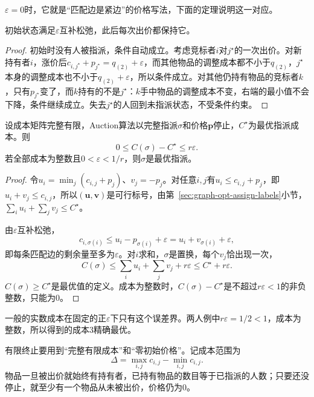 $\varepsilon=0$时，它就是“匹配边是紧边”的价格写法，下面的定理说明这一对应。

\begin{lemma}
初始状态满足$\varepsilon$互补松弛，此后每次出价都保持它。
\end{lemma}

\begin{proof}
初始时没有人被指派，条件自动成立。考虑竞标者$i$对$j^\star$的一次出价。对新持有者$i$，涨价后$c_{i,j^\star}+p_{j^\star}=q_{(2)}+\varepsilon$，而其他物品的调整成本都不小于$q_{(2)}$，$j^\star$本身的调整成本也不小于$q_{(2)}+\varepsilon$，所以条件成立。对其他仍持有物品的竞标者$k$，只有$p_{j^\star}$变了，而$k$持有的不是$j^\star$：$k$手中物品的调整成本不变，右端的最小值不会下降，条件继续成立。失去$j^\star$的人回到未指派状态，不受条件约束。
\end{proof}

\begin{theorem}[Auction算法的误差界]
\label{thm:graph-opt-auction}
设成本矩阵完整有限，Auction算法以完整指派$\sigma$和价格$\bm p$停止，$C^\star$为最优指派成本。则
\begin{equation}
  0\leq C(\sigma)-C^\star\leq r\varepsilon.
  \label{eq:graph-opt-auction-error}
\end{equation}
若全部成本为整数且$0<\varepsilon<1/r$，则$\sigma$是最优指派。
\end{theorem}

\begin{proof}
令$u_i=\min_j(c_{i,j}+p_j)$、$v_j=-p_j$。对任意$i,j$有$u_i\leq c_{i,j}+p_j$，即$u_i+v_j\leq c_{i,j}$，所以$(\bm u,\bm v)$是可行标号，由第~\ref{sec:graph-opt-assign-labels}小节，$\sum_iu_i+\sum_jv_j\leq C^\star$。

由$\varepsilon$互补松弛，
\[
  c_{i,\sigma(i)}\leq u_i-p_{\sigma(i)}+\varepsilon=u_i+v_{\sigma(i)}+\varepsilon,
\]
即每条匹配边的剩余量至多为$\varepsilon$。对$i$求和，$\sigma$是置换，每个$v_j$恰出现一次，
\[
  C(\sigma)\leq\sum_iu_i+\sum_jv_j+r\varepsilon\leq C^\star+r\varepsilon.
\]
$C(\sigma)\geq C^\star$是最优值的定义。成本为整数时，$C(\sigma)-C^\star$是不超过$r\varepsilon<1$的非负整数，只能为$0$。
\end{proof}

一般的实数成本在固定的正$\varepsilon$下只有这个误差界。两人例中$r\varepsilon=1/2<1$，成本为整数，所以得到的成本$3$精确最优。

有限终止要用到“完整有限成本”和“零初始价格”。记成本范围为
\[
  \Delta=\max_{i,j}c_{i,j}-\min_{i,j}c_{i,j}.
\]
物品一旦被出价就始终有持有者，已持有物品的数目等于已指派的人数；只要还没停止，就至少有一个物品从未被出价，价格仍为$0$。

